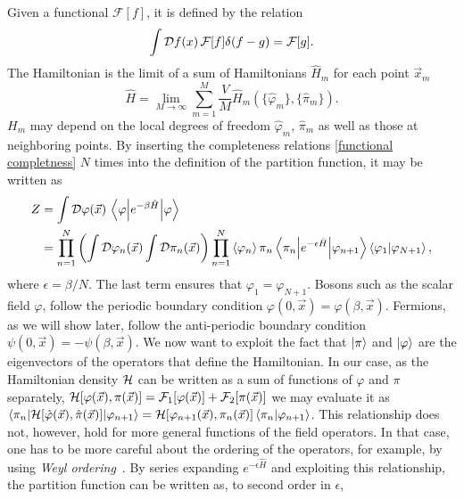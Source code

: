Given a functional $\mathcal{F}[f]$, it is defined by the relation
%
\begin{equation}
    \int \mathcal D f(x)\, \mathcal{F}[f] \delta(f - g) = \mathcal{F}[g].
\end{equation}
%
The Hamiltonian is the limit of a sum of Hamiltonians $\hat H_m$ for each point $\vec x_m$
%
\begin{equation*}
    \hat H
    = \lim_{M \rightarrow \infty} \sum_{m=1}^M 
    \frac{V}{M} \hat H_m(\{\hat \varphi_m\}, \{\hat \pi_m\}).
\end{equation*}
$H_m$ may depend on the local degrees of freedom $\hat \varphi_m, \, \hat \pi_m$ as well as those at neighboring points.
By inserting the completeness relations \autoref{functional completness} $N$ times into the definition of the partition function, it may be written as
%
\begin{align*}
    Z& 
    = \int \mathcal D\varphi(\vec x) \, \left\langle \varphi {\left| e^{- \beta \hat H} \right|} \varphi \right\rangle\\
    &= 
    \prod_{n=1}^N
    \left(
        \int \mathcal D \varphi_n (\vec x) \int \mathcal D \pi_n(\vec x)
    \right) 
    \prod_{n=1}^N  \braket{\varphi_n}{\pi_n}
    \left\langle \pi_n {\left| e^{- \epsilon \hat H} \right|} \varphi_{n+1} \right\rangle \braket{\varphi_{1} | \varphi_{N+1}},
\end{align*}
%
where $\epsilon = \beta / N$. The last term ensures that $\varphi_1 = \varphi_{N+1}$.
Bosons such as the scalar field $\varphi$, follow the periodic boundary condition $\varphi(0, \vec x) = \varphi(\beta, \vec x)$.
Fermions, as we will show later, follow the anti-periodic boundary condition $\psi(0, \vec x) = -\psi(\beta, \vec x)$.
We now want to exploit the fact that $\ket{\pi}$ and $\ket{\varphi}$ are the eigenvectors of the operators that define the Hamiltonian.
In our case, as the Hamiltonian density $\mathcal{H}$ can be written as a sum of functions of $\varphi$ and $\pi$ separately, $\mathcal{H}[\varphi(\vec x), \pi(\vec x)] = \mathcal{F}_1[\varphi(\vec x)] + \mathcal{F}_2[\pi(\vec x)]$ we may evaluate it as $\left\langle \pi_n {\left| \mathcal{H}[\hat \varphi(\vec x), \hat \pi(\vec x)] \right|} \varphi_{n+1} \right\rangle = \mathcal{H}[\varphi_{n+1}(\vec x), \pi_n(\vec x)] \braket{\pi_n | \varphi_{n+1}}$.
This relationship does not, however, hold for more general functions of the field operators.
In that case, one has to be more careful about the ordering of the operators, for example, by using \emph{Weyl ordering}~\cite{peskinIntroductionQuantumField1995}.
By series expanding $e^{-\epsilon \hat H}$ and exploiting this relationship, the partition function can be written as, to second order in $\epsilon$,

